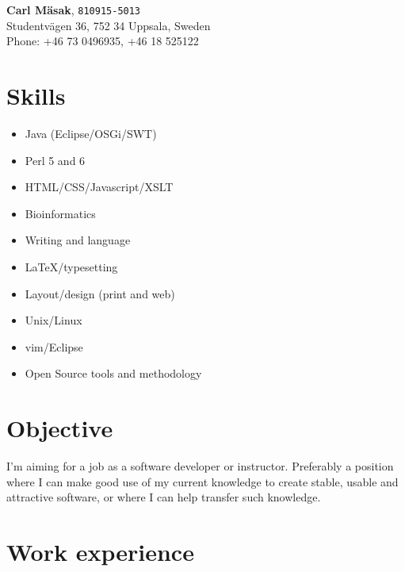 \documentclass[11pt,a4paper]{article}
\begin{document}
\noindent
\textbf{Carl Mäsak}, \texttt{810915-5013} \\
Studentvägen 36, 752 34 Uppsala, Sweden \\
Phone: +46 73 0496935, +46 18 525122

\section*{Skills}

\begin{itemize}

\item Java (Eclipse/OSGi/SWT)

\item Perl 5 and 6

\item HTML/CSS/Javascript/XSLT

\item Bioinformatics

\item Writing and language

\item \LaTeX/typesetting

\item Layout/design (print and web)

\item Unix/Linux

\item vim/Eclipse

\item Open Source tools and methodology

\end{itemize}

\section*{Objective}

I'm aiming for a job as a software developer or instructor. Preferably a
position where I can make good use of my current knowledge to create stable,
usable and attractive software, or where I can help transfer such knowledge.

\section*{Work experience}
\end{document}
